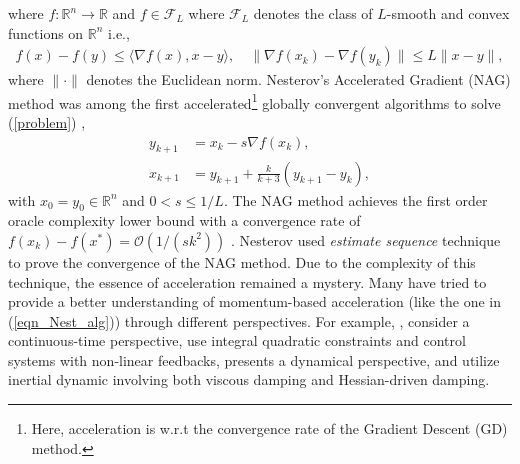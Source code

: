\documentclass{article}
\theoremstyle{plain}
\theoremstyle{definition}
\theoremstyle{remark}
\begin{document}
where $f:\mathbb{R}^n\rightarrow \mathbb{R}$ and \(f\in\mathcal{F}_{L}\) where \(\mathcal{F}_{L}\) denotes the class of \(L\)-smooth and convex functions on \(\mathbb{R}^n\) i.e.,
\begin{align}\label{cvx-smthness}
 f(x)-f(y)\leq \langle \nabla f(x),x-y \rangle,\quad \|\nabla f(x_k)-\nabla f(y_k)\|\leq L \|x-y\|,
\end{align}
where \(\|\cdot\|\) denotes the Euclidean norm. Nesterov's Accelerated Gradient (NAG) method was among the first accelerated\footnote{Here, acceleration is w.r.t the convergence rate of the Gradient Descent (GD) method.} globally convergent algorithms to solve (\ref{problem}) \citep{Nesterov1983AMF},
 \begin{align}\label{eqn_Nest_alg}
    y_{k+1}&=x_k -s\nabla f(x_k),\\
    x_{k+1}&= y_{k+1}+\frac{k}{k+3} (y_{k+1}-y_{k}),\nonumber
\end{align}
with \(x_0=y_0\in\mathbb R^n\) and \(0< s\leq 1/L\). The NAG method achieves the first order oracle complexity lower bound with a convergence rate of \(f(x_k)-f(x^*)=\mathcal O (1/(sk^2))\) \citep{nesterov2003introductory}. Nesterov used \textit{estimate sequence} technique to prove the convergence of the NAG method. Due to the complexity of this technique, the essence of acceleration remained a mystery. Many have tried to provide a better understanding of momentum-based acceleration (like the one in (\ref{eqn_Nest_alg})) through different perspectives. For example, \citep{JMLR:v17:15-084,shi2019acceleration,Shi2021UnderstandingTA,sanz2021connections}, consider a continuous-time perspective, \citep{Lessard2016AnalysisAD,doi:10.1137/17M1136845} use integral quadratic constraints and control systems with non-linear feedbacks, \citep{muehlebach2019dynamical,muehlebach2022constraints,muehlebach2023accelerated} presents a dynamical perspective, and \citep{attouch2020first,attouch2021convergence} utilize inertial dynamic involving both viscous damping and Hessian-driven damping. 
\end{document}
